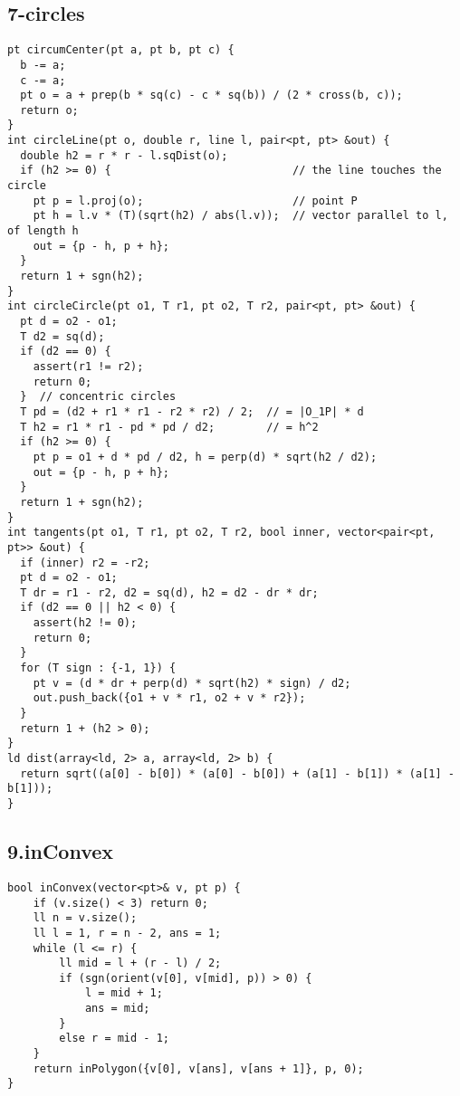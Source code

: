 \documentclass[twoside]{article}
\begin{document}
\begin{multicols*}{2}
{\subsection*{7-circles}
}
\begin{verbatim}
pt circumCenter(pt a, pt b, pt c) {
  b -= a;
  c -= a;
  pt o = a + prep(b * sq(c) - c * sq(b)) / (2 * cross(b, c));
  return o;
}
int circleLine(pt o, double r, line l, pair<pt, pt> &out) {
  double h2 = r * r - l.sqDist(o);
  if (h2 >= 0) {                            // the line touches the circle
    pt p = l.proj(o);                       // point P
    pt h = l.v * (T)(sqrt(h2) / abs(l.v));  // vector parallel to l, of length h
    out = {p - h, p + h};
  }
  return 1 + sgn(h2);
}
int circleCircle(pt o1, T r1, pt o2, T r2, pair<pt, pt> &out) {
  pt d = o2 - o1;
  T d2 = sq(d);
  if (d2 == 0) {
    assert(r1 != r2);
    return 0;
  }  // concentric circles
  T pd = (d2 + r1 * r1 - r2 * r2) / 2;  // = |O_1P| * d
  T h2 = r1 * r1 - pd * pd / d2;        // = h^2
  if (h2 >= 0) {
    pt p = o1 + d * pd / d2, h = perp(d) * sqrt(h2 / d2);
    out = {p - h, p + h};
  }
  return 1 + sgn(h2);
}
int tangents(pt o1, T r1, pt o2, T r2, bool inner, vector<pair<pt, pt>> &out) {
  if (inner) r2 = -r2;
  pt d = o2 - o1;
  T dr = r1 - r2, d2 = sq(d), h2 = d2 - dr * dr;
  if (d2 == 0 || h2 < 0) {
    assert(h2 != 0);
    return 0;
  }
  for (T sign : {-1, 1}) {
    pt v = (d * dr + perp(d) * sqrt(h2) * sign) / d2;
    out.push_back({o1 + v * r1, o2 + v * r2});
  }
  return 1 + (h2 > 0);
}
ld dist(array<ld, 2> a, array<ld, 2> b) {
  return sqrt((a[0] - b[0]) * (a[0] - b[0]) + (a[1] - b[1]) * (a[1] - b[1]));
}

\end{verbatim}

{
\subsection*{9.inConvex}
}
\begin{verbatim}
bool inConvex(vector<pt>& v, pt p) {
    if (v.size() < 3) return 0;
    ll n = v.size();
    ll l = 1, r = n - 2, ans = 1;
    while (l <= r) {
        ll mid = l + (r - l) / 2;
        if (sgn(orient(v[0], v[mid], p)) > 0) {
            l = mid + 1;
            ans = mid;
        }
        else r = mid - 1;
    }
    return inPolygon({v[0], v[ans], v[ans + 1]}, p, 0);
}
\end{verbatim}


\end{multicols*}
\end{document}
